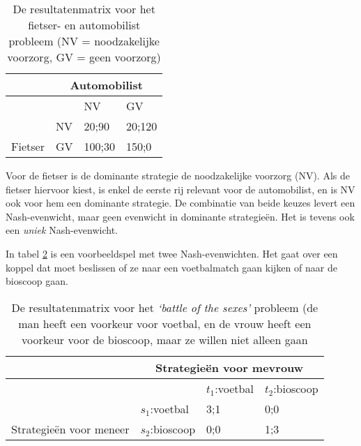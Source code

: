 \begin{table}[H]
\small\centering\captionsetup{justification=centering,margin=2cm}
\begin{tabular}{l|lll}
\cline{2-4}
 & \multicolumn{3}{c|}{\cellcolor[HTML]{EFEFEF}Automobilist} \\ \hline
\multicolumn{1}{|l|}{\cellcolor[HTML]{EFEFEF}} &  & NV & GV \\
\multicolumn{1}{|l|}{\cellcolor[HTML]{EFEFEF}} & NV & 20;90 & 20;120 \\
\multicolumn{1}{|l|}{\multirow{-3}{*}{\cellcolor[HTML]{EFEFEF}Fietser}} & GV & 100;30 & 150;0 \\ \cline{1-1}
\end{tabular}
\caption{De resultatenmatrix voor het fietser- en automobilist probleem (NV = noodzakelijke voorzorg, GV = geen voorzorg)}
\label{tab:h3spel3}
\end{table}

Voor de fietser is de dominante strategie de noodzakelijke voorzorg (NV). Als de fietser hiervoor kiest, is enkel de eerste rij relevant voor de automobilist, en is NV ook voor hem een dominante strategie. De combinatie van beide keuzes levert een Nash-evenwicht, maar geen evenwicht in dominante strategie\"en. Het is tevens ook een \textit{uniek} Nash-evenwicht.\\

\par In tabel \ref{tab:h3spel4} is een voorbeeldspel met twee Nash-evenwichten. Het gaat over een koppel dat moet beslissen of ze naar een voetbalmatch gaan kijken of naar de bioscoop gaan.

\begin{table}[H]
\small\centering\captionsetup{justification=centering,margin=2cm}
\begin{tabular}{l|lll}
\cline{2-4}
 & \multicolumn{3}{c|}{\cellcolor[HTML]{EFEFEF}Strategie\"en voor mevrouw} \\ \hline
\multicolumn{1}{|l|}{\cellcolor[HTML]{EFEFEF}} &  & $t_1$:voetbal & $t_2$:bioscoop \\
\multicolumn{1}{|l|}{\cellcolor[HTML]{EFEFEF}} & $s_1$:voetbal & 3;1 & 0;0 \\
\multicolumn{1}{|l|}{\multirow{-3}{*}{\cellcolor[HTML]{EFEFEF}Strategie\"en voor meneer}} & $s_2$:bioscoop & 0;0 & 1;3 \\ \cline{1-1}
\end{tabular}
\caption{De resultatenmatrix voor het \textit{`battle of the sexes'} probleem (de man heeft een voorkeur voor voetbal, en de vrouw heeft een voorkeur voor de bioscoop, maar ze willen niet alleen gaan}
\label{tab:h3spel4}
\end{table}

